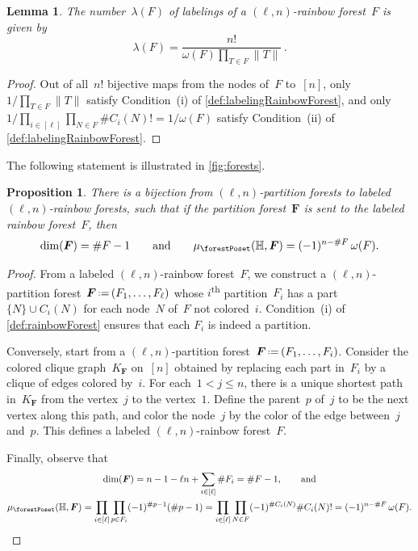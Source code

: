 \documentclass{amsart}
\newtheorem{proposition}[theorem]{Proposition}
\newtheorem{lemma}[theorem]{Lemma}
\theoremstyle{definition}
\renewcommand{\b}[1]{{\boldsymbol{#1}}} %
\newcommand{\eqdef}{\mbox{\,\raisebox{0.2ex}{\scriptsize\ensuremath{\mathrm:}}\ensuremath{=}\,}} %
\newcommand{\ordinal}{\textsuperscript{th}} %
\renewcommand{\b}[1]{\boldsymbol{#1}} %
\newcommand{\HH}{\mathbb{H}} %
\begin{document}
\begin{lemma}
\label{lem:labelingRainbowForest}
The number~$\lambda(F)$ of labelings of a $(\ell,n)$-rainbow forest~$F$ is given by
\[
\lambda(F) = \frac{n!}{\omega(F) \prod\limits_{T \in F} \|T\|} \, .
\]
\end{lemma}

\begin{proof}
Out of all~$n!$ bijective maps from the nodes of~$F$ to~$[n]$, only~$1/\prod_{T \in F} \|T\|$ satisfy Condition~(i) of \cref{def:labelingRainbowForest}, and only $1/\prod_{i \in [\ell]} \prod_{N \in F} \#C_i(N)! = 1/\omega(F)$ satisfy Condition~(ii) of \cref{def:labelingRainbowForest}.
\end{proof}

The following statement is illustrated in \cref{fig:forests}.

\begin{proposition}
\label{prop:bijectionForests}
There is a bijection from $(\ell,n)$-partition forests to labeled $(\ell,n)$-rainbow forests, such that if the partition forest~$\b{F}$ is sent to the labeled rainbow forest~$F$, then
\[
\dim(\b{F}) = \#F-1
\qquad\text{and}\qquad
\mu_{\forestPoset}(\HH, \b{F}) = (-1)^{n-\#F} \, \omega(F).
\]
\end{proposition}

\begin{proof}
From a labeled $(\ell,n)$-rainbow forest~$F$, we construct a $(\ell,n)$-partition forest~$\b{F} \eqdef (F_1, \dots, F_\ell)$ whose $i$\ordinal{} partition~$F_i$ has a part~$\{N\} \cup C_i(N)$ for each node~$N$ of~$F$ not colored~$i$.
Condition~(i) of \cref{def:rainbowForest} ensures that each $F_i$ is indeed a partition.

Conversely, start from a $(\ell,n)$-partition forest~$\b{F} \eqdef (F_1, \dots, F_i)$.
Consider the colored clique graph~$K_{\b{F}}$ on~$[n]$ obtained by replacing each part in~$F_i$ by a clique of edges colored by~$i$.
For each~$1 < j \le n$, there is a unique shortest path in~$K_{\b{F}}$ from the vertex~$j$ to the vertex~$1$.
Define the parent~$p$ of~$j$ to be the next vertex along this path, and color the node~$j$ by the color of the edge between~$j$ and~$p$.
This defines a labeled $(\ell,n)$-rainbow forest~$F$.

Finally, observe that
\begin{gather*}
\dim(\b{F}) = n - 1 - \ell n + \sum_{i \in [\ell]} \#F_i = \#F-1, \qquad\text{and} \\
\mu_{\forestPoset}(\HH, \b{F}) = \prod\limits_{i \in [\ell]} \prod\limits_{p \in F_i} (-1)^{\#p-1} (\#p-1) = \prod\limits_{i \in [\ell]} \prod\limits_{N \in F} (-1)^{\#C_i(N)} \#C_i(N)! = (-1)^{n-\#F} \, \omega(F).
\qedhere
\end{gather*}
\end{proof}
\end{document}
